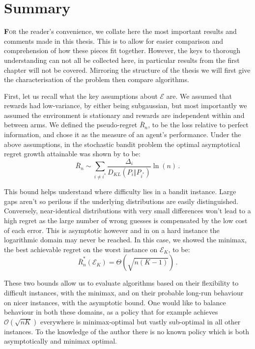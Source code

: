 \chapter*{Summary}

\lettrine[lines=4]{\textcolor{dropcap}{\textbf{F}}}{or} the reader's convenience, we collate here the most important results and comments made in this thesis. This is to allow for easier comparison and comprehension of how these pieces fit together. However, the keys to thorough understanding can not all be collected here, in particular results from the first chapter will not be covered.  Mirroring the structure of the thesis we will first give the characterisation of the problem then compare algorithms. 

\par First, let us recall what the key assumptions about $\mathcal{E}$ are. We assumed that rewards had low-variance, by either being subgaussian, but most importantly we assumed the environment is stationary and rewards are independent within and between arms. We defined the pseudo-regret $\bar{R}_n$, to be the loss relative to perfect information, and chose it as the measure of an agent's performance. 
Under the above assumptions, in the stochastic bandit problem the optimal asymptotical regret growth attainable was shown by \citet{lai-robbins:1985} to be:
\[ \bar{R}_n\sim \sum_{i\neq i^*}\frac{\Delta_i}{D_{KL}(P_i\Vert P_{i^*})}\ln(n)\,.\]

\par This bound helps understand where difficulty lies in a bandit instance. Large gaps aren't so perilous if the underlying distributions are easily distinguished. Conversely, near-identical distributions with very small differences won't lead to a high regret as the large number of wrong guesses is compensated by the low cost of each error. This is asymptotic however and in on a hard instance the logarithmic domain may never be reached. In this case, we showed the minimax, the best achievable regret on the worst instance on $\mathcal{E}_K$, to be: 
\[ \bar{R}_n^*(\mathcal{E}_K)=\Theta\left(\sqrt{n(K-1)}\right)\,.\]

\par These two bounds allow us to evaluate algorithms based on their flexibility to difficult instances, with the minimax, and on their probable long-run behaviour on nicer instances, with the asymptotic bound. One would like to balance behaviour in both these domains, as a policy that for example achieves $\mathcal{O}(\sqrt{nK})$ everywhere is minimax-optimal but vastly sub-optimal in all other instances. To the knowledge of the author there is no known policy which is both asymptotically and minimax optimal. 

